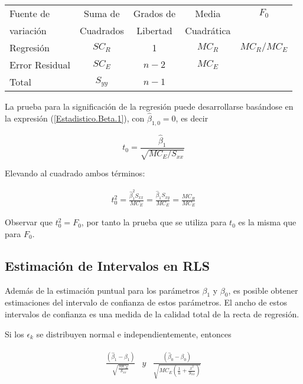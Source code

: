 \begin{itemize}
\begin{enumerate}
\begin{tabular}{lcccc}\hline
Fuente de & Suma de  &  Grados de  & Media  & $F_{0}$ \\ 
 variaci\'on & Cuadrados & Libertad & Cuadr\'atica & \\\hline
 Regresi\'on & $SC_{R}$ & 1 & $MC_{R}$  & $MC_{R}/MC_{E}$\\
 Error Residual & $SC_{E}$ & $n-2$ & $MC_{E}$ & \\\hline
 Total & $S_{yy}$ & $n-1$ & & \\\hline
\end{tabular} 

La prueba para la significaci\'on de la regresi\'on puede desarrollarse bas\'andose en la expresi\'on (\ref{Estadistico.Beta.1}), con $\hat{\beta}_{1,0}=0$, es decir

\begin{equation}\label{Estadistico.Beta.1.Cero}
t_{0}=\frac{\hat{\beta}_{1}}{\sqrt{MC_{E}/S_{xx}}}
\end{equation}

Elevando al cuadrado ambos t\'erminos:

\begin{eqnarray*}
t_{0}^{2}=\frac{\hat{\beta}_{1}^{2}S_{xx}}{MC_{E}}=\frac{\hat{\beta}_{1}S_{xy}}{MC_{E}}=\frac{MC_{R}}{MC_{E}}
\end{eqnarray*}

Observar que $t_{0}^{2}=F_{0}$, por tanto la prueba que se utiliza para $t_{0}$ es la misma que para $F_{0}$.

\subsection*{Estimaci\'on de Intervalos en RLS}

Adem\'as de la estimaci\'on puntual para los par\'ametros $\beta_{1}$ y $\beta_{0}$, es posible obtener estimaciones del intervalo de confianza de estos par\'ametros. El ancho de estos intervalos de confianza es una medida de la calidad total de la recta de regresi\'on.


Si los $\epsilon_{k}$ se distribuyen normal e independientemente, entonces

\begin{eqnarray*}
\begin{array}{ccc}
\frac{\left(\hat{\beta}_{1}-\beta_{1}\right)}{\sqrt{\frac{MC_{E}}{S_{xx}}}}&y &\frac{\left(\hat{\beta}_{0}-\beta_{0}\right)}{\sqrt{MC_{E}\left(\frac{1}{n}+\frac{\overline{x}^{2}}{S_{xx}}\right)}}
\end{array}
\end{eqnarray*}


\end{enumerate}
\end{itemize}
